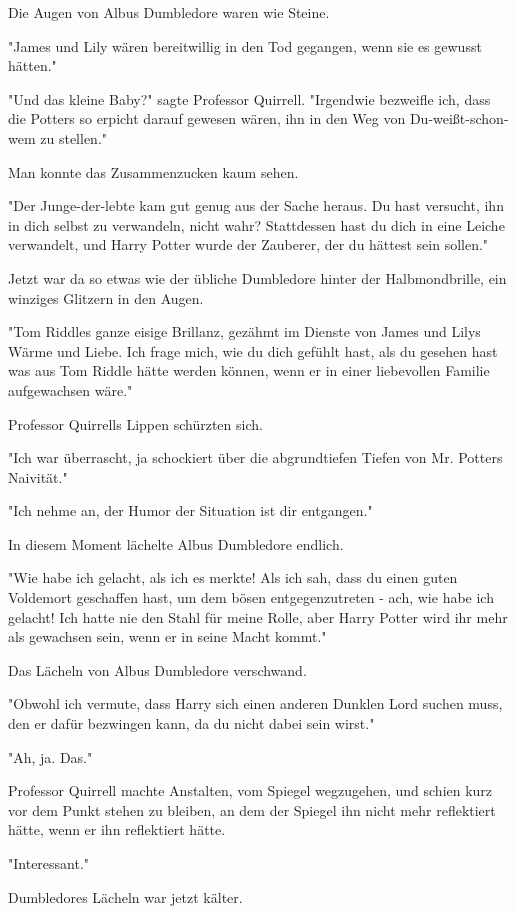 {Die Augen von Albus Dumbledore waren wie Steine.

"James und Lily wären bereitwillig in den Tod gegangen, wenn sie es gewusst hätten."

"Und das kleine Baby?" sagte Professor Quirrell. "Irgendwie bezweifle ich, dass die Potters so erpicht darauf gewesen wären, ihn in den Weg von Du-weißt-schon-wem zu stellen."

Man konnte das Zusammenzucken kaum sehen.

"Der Junge-der-lebte kam gut genug aus der Sache heraus. Du hast versucht, ihn in dich selbst zu verwandeln, nicht wahr? Stattdessen hast du dich in eine Leiche verwandelt, und Harry Potter wurde der Zauberer, der du hättest sein sollen."

Jetzt war da so etwas wie der übliche Dumbledore hinter der Halbmondbrille, ein winziges Glitzern in den Augen.

"Tom Riddles ganze eisige Brillanz, gezähmt im Dienste von James und Lilys Wärme und Liebe. Ich frage mich, wie du dich gefühlt hast, als du gesehen hast was aus Tom Riddle hätte werden können, wenn er in einer liebevollen Familie aufgewachsen wäre."

Professor Quirrells Lippen schürzten sich.

"Ich war überrascht, ja schockiert über die abgrundtiefen Tiefen von Mr. Potters Naivität."

"Ich nehme an, der Humor der Situation ist dir entgangen."

In diesem Moment lächelte Albus Dumbledore endlich.

"Wie habe ich gelacht, als ich es merkte! Als ich sah, dass du einen guten Voldemort geschaffen hast, um dem bösen entgegenzutreten - ach, wie habe ich gelacht! Ich hatte nie den Stahl für meine Rolle, aber Harry Potter wird ihr mehr als gewachsen sein, wenn er in seine Macht kommt."

Das Lächeln von Albus Dumbledore verschwand.

"Obwohl ich vermute, dass Harry sich einen anderen Dunklen Lord suchen muss, den er dafür bezwingen kann, da du nicht dabei sein wirst."

"Ah, ja. Das."

Professor Quirrell machte Anstalten, vom Spiegel wegzugehen, und schien kurz vor dem Punkt stehen zu bleiben, an dem der Spiegel ihn nicht mehr reflektiert hätte, wenn er ihn reflektiert hätte.

"Interessant."

Dumbledores Lächeln war jetzt kälter.

}
